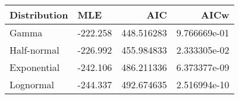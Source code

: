 \begin{tabular}{llrr}
\toprule
Distribution &      MLE &         AIC &          AICw \\
\midrule
       Gamma & -222.258 &  448.516283 &  9.766669e-01 \\
 Half-normal & -226.992 &  455.984833 &  2.333305e-02 \\
 Exponential & -242.106 &  486.211336 &  6.373377e-09 \\
   Lognormal & -244.337 &  492.674635 &  2.516994e-10 \\
\bottomrule
\end{tabular}
